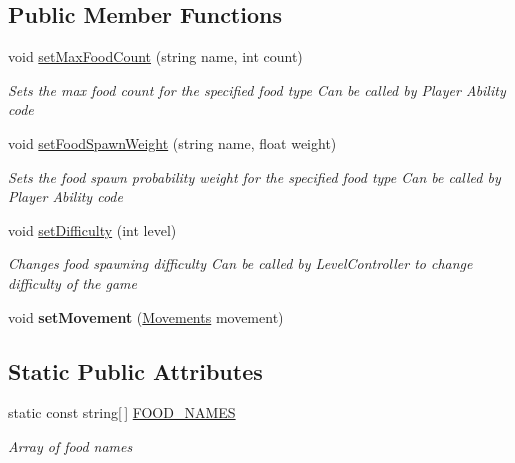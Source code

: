 \subsection*{Public Member Functions}
\begin{DoxyCompactItemize}
\item 
void \hyperlink{class_food_controller_a9f0f153ce5e90b4e081f4d903cf17808}{set\+Max\+Food\+Count} (string name, int count)
\begin{DoxyCompactList}\small\item\em Sets the max food count for the specified food type Can be called by Player Ability code \end{DoxyCompactList}\item 
void \hyperlink{class_food_controller_ae118c67950b39a9b3aaa8e15f027a37b}{set\+Food\+Spawn\+Weight} (string name, float weight)
\begin{DoxyCompactList}\small\item\em Sets the food spawn probability weight for the specified food type Can be called by Player Ability code \end{DoxyCompactList}\item 
void \hyperlink{class_food_controller_a33196e4fa774e489de86cedaff452e83}{set\+Difficulty} (int level)
\begin{DoxyCompactList}\small\item\em Changes food spawning difficulty Can be called by Level\+Controller to change difficulty of the game \end{DoxyCompactList}\item 
void {\bfseries set\+Movement} (\hyperlink{class_food_controller_ad3c2e51ce55236ad80384113f1593c79}{Movements} movement)\hypertarget{class_food_controller_a239fd152177e7e1d5dc13612b6665d10}{}\label{class_food_controller_a239fd152177e7e1d5dc13612b6665d10}

\end{DoxyCompactItemize}
\subsection*{Static Public Attributes}
\begin{DoxyCompactItemize}
\item 
static const string\mbox{[}$\,$\mbox{]} \hyperlink{class_food_controller_a8068d88c9eae23423e9b247f2381c600}{F\+O\+O\+D\+\_\+\+N\+A\+M\+ES}
\begin{DoxyCompactList}\small\item\em Array of food names \end{DoxyCompactList}\end{DoxyCompactItemize}


